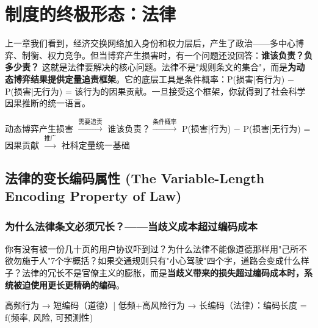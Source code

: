 \documentclass[../main.tex]{subfiles}
\begin{document}
	
	\chapter{制度的终极形态：法律}

	\begin{motivation}

		上一章我们看到，经济交换网络加入身份和权力层后，产生了政治——多中心博弈、制衡、权力竞争。但当博弈产生损害时，有一个问题还没回答：\textbf{谁该负责？负多少责？} 这就是法律要解决的核心问题。法律不是"规则条文的集合"，而是\textbf{为动态博弈结果提供定量追责框架}。它的底层工具是条件概率：P(损害|有行为) − P(损害|无行为) = 该行为的因果贡献。一旦接受这个框架，你就得到了社会科学因果推断的统一语言。

	\end{motivation}
	
	\begin{logicmap}

		动态博弈产生损害 $\xrightarrow{\text{需要追责}}$ 谁该负责？$\xrightarrow{\text{条件概率}}$ P(损害|行为) − P(损害|无行为) = 因果贡献 $\xrightarrow{\text{推广}}$ 社科定量统一基础

	\end{logicmap}

	\section{法律的变长编码属性 (The Variable-Length Encoding Property of Law)}
	
	\subsection{为什么法律条文必须冗长？——当歧义成本超过编码成本}
	
	\begin{motivation}

		你有没有被一份几十页的用户协议吓到过？为什么法律不能像道德那样用"己所不欲勿施于人"7个字概括？如果交通规则只有"小心驾驶"四个字，道路会变成什么样子？法律的冗长不是官僚主义的膨胀，而是\textbf{当歧义带来的损失超过编码成本时，系统被迫使用更长更精确的编码}。

	\end{motivation}
	
	\begin{logicmap}

		高频行为 → 短编码（道德）| 低频+高风险行为 → 长编码（法律）：编码长度 = f(频率, 风险, 可预测性)

	\end{logicmap}
	
\end{document}
